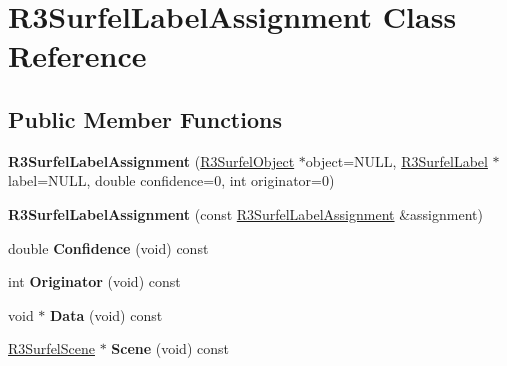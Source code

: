 \hypertarget{class_r3_surfel_label_assignment}{}\section{R3\+Surfel\+Label\+Assignment Class Reference}
\label{class_r3_surfel_label_assignment}
\subsection*{Public Member Functions}
\begin{DoxyCompactItemize}
\item 
{\bfseries R3\+Surfel\+Label\+Assignment} (\hyperlink{class_r3_surfel_object}{R3\+Surfel\+Object} $\ast$object=N\+U\+LL, \hyperlink{class_r3_surfel_label}{R3\+Surfel\+Label} $\ast$label=N\+U\+LL, double confidence=0, int originator=0)\hypertarget{class_r3_surfel_label_assignment_a9466bcb95619bb23c8359a7bb36723f4}{}\label{class_r3_surfel_label_assignment_a9466bcb95619bb23c8359a7bb36723f4}

\item 
{\bfseries R3\+Surfel\+Label\+Assignment} (const \hyperlink{class_r3_surfel_label_assignment}{R3\+Surfel\+Label\+Assignment} \&assignment)\hypertarget{class_r3_surfel_label_assignment_a8a91dee55101fc0b9d15eab6dbd572f6}{}\label{class_r3_surfel_label_assignment_a8a91dee55101fc0b9d15eab6dbd572f6}

\item 
double {\bfseries Confidence} (void) const \hypertarget{class_r3_surfel_label_assignment_a4dcbabb8300a6ff9c06d87e4389294e6}{}\label{class_r3_surfel_label_assignment_a4dcbabb8300a6ff9c06d87e4389294e6}

\item 
int {\bfseries Originator} (void) const \hypertarget{class_r3_surfel_label_assignment_a29c28d04e6b45991e543d4dd9fff42bf}{}\label{class_r3_surfel_label_assignment_a29c28d04e6b45991e543d4dd9fff42bf}

\item 
void $\ast$ {\bfseries Data} (void) const \hypertarget{class_r3_surfel_label_assignment_a227ab6712b63c6ae7993c8eb22a05814}{}\label{class_r3_surfel_label_assignment_a227ab6712b63c6ae7993c8eb22a05814}

\item 
\hyperlink{class_r3_surfel_scene}{R3\+Surfel\+Scene} $\ast$ {\bfseries Scene} (void) const \hypertarget{class_r3_surfel_label_assignment_a7c6434171ae949babaaa5f5b15c16724}{}\label{class_r3_surfel_label_assignment_a7c6434171ae949babaaa5f5b15c16724}


\end{DoxyCompactItemize}
